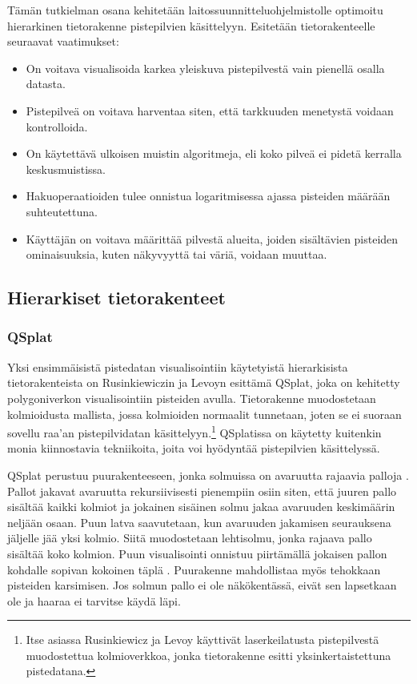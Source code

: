 Tämän tutkielman osana kehitetään laitossuunnitteluohjelmistolle optimoitu hierarkinen tietorakenne pistepilvien käsittelyyn. Esitetään tietorakenteelle seuraavat vaatimukset:
\begin{itemize}
    \item On voitava visualisoida karkea yleiskuva pistepilvestä vain pienellä osalla datasta. 
    \item Pistepilveä on voitava harventaa siten, että tarkkuuden menetystä voidaan kontrolloida.
    \item On käytettävä ulkoisen muistin algoritmeja, eli koko pilveä ei pidetä kerralla keskusmuistissa.
    \item Hakuoperaatioiden tulee onnistua logaritmisessa ajassa pisteiden määrään suhteutettuna.
    \item Käyttäjän on voitava määrittää pilvestä alueita, joiden sisältävien pisteiden ominaisuuksia, kuten näkyvyyttä tai väriä, voidaan muuttaa.
\end{itemize}

\subsection{Hierarkiset tietorakenteet}

\subsubsection{QSplat}
Yksi ensimmäisistä pistedatan visualisointiin käytetyistä hierarkisista tietorakenteista on Rusinkiewiczin ja Levoyn esittämä QSplat, joka on kehitetty polygoniverkon visualisointiin pisteiden avulla. Tietorakenne muodostetaan kolmioidusta mallista, jossa kolmioiden normaalit tunnetaan, joten se ei suoraan sovellu raa'an pistepilvidatan käsittelyyn.\footnote{Itse asiassa Rusinkiewicz ja Levoy käyttivät laserkeilatusta pistepilvestä muodostettua kolmioverkkoa, jonka tietorakenne esitti yksinkertaistettuna pistedatana.} QSplatissa on käytetty kuitenkin monia kiinnostavia tekniikoita, joita voi hyödyntää pistepilvien käsittelyssä. \cite{qsplat}

QSplat perustuu puurakenteeseen, jonka solmuissa on avaruutta rajaavia palloja . Pallot jakavat avaruutta rekursiivisesti pienempiin osiin siten, että juuren pallo sisältää kaikki kolmiot ja jokainen sisäinen solmu jakaa avaruuden keskimäärin neljään osaan. Puun latva saavutetaan, kun avaruuden jakamisen seurauksena jäljelle jää yksi kolmio. Siitä muodostetaan lehtisolmu, jonka rajaava pallo sisältää koko kolmion. Puun visualisointi onnistuu piirtämällä jokaisen pallon kohdalle sopivan kokoinen täplä . Puurakenne mahdollistaa myös tehokkaan pisteiden karsimisen. Jos solmun pallo ei ole näkökentässä, eivät sen lapsetkaan ole ja haaraa ei tarvitse käydä läpi. \cite{qsplat}

